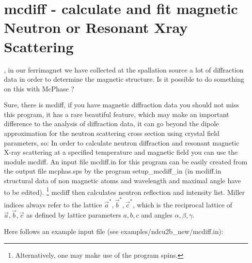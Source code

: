 \section{{\prg mcdiff} - calculate and fit  magnetic Neutron or Resonant Xray 
Scattering}\label{mcdiff}

\OO \ee, in our ferrimagnet we have collected at the spallation source a lot of diffraction
data in order to determine the magnetic structure. Is it possible to do something on this
with {\prg McPhase} ?

\EE Sure, there is {\prg mcdiff}, if you have magnetic diffraction data you should not miss
this program, it has a rare beautiful feature, which may make an important difference to
the analysis of diffraction data, it can go beyond the dipole approximation for the 
neutron scattering cross section using crystal field parameters, so:
In order to calculate neutron diffraction and resonant magnetic X-ray scattering
at a specified temperature and magnetic field you can use the module {\prg mcdiff}.
An input file {\prg mcdiff.in } for this program can be easily created from
the output file {\prg mcphas.sps} by the program {\prg setup\_mcdiff\_in}
(in {\prg mcdiff.in } structural data of non magnetic atoms and wavelength
                        and maximal angle have to be edited).
\footnote{Alternatively, one may make use of the program {\prg spins}.} 
{\prg mcdiff} then calculates neutron reflection and intensity list.
Miller indices always refer to the lattice $\vec a^*, \vec b^*, \vec c^*$, which
is the reciprocal lattice of $\vec a, \vec b, \vec c$ as defined by lattice
parameters $a,b,c$ and angles $\alpha,\beta,\gamma$.

Here follows an example input file (see examples/ndcu2b\_new/mcdiff.in):

